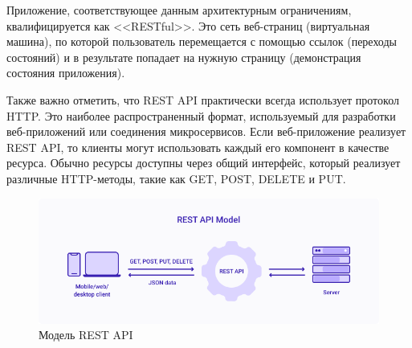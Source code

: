 


Приложение, соответствующее данным архитектурным ограничениям, квалифицируется как <<RESTful>>. Это сеть веб-страниц (виртуальная машина), по которой пользователь перемещается с помощью ссылок (переходы состояний) и в результате попадает на нужную страницу (демонстрация состояния приложения).

Также важно отметить, что REST API практически всегда использует протокол HTTP. Это наиболее распространенный формат, используемый для разработки веб-приложений или соединения микросервисов. Если веб-приложение реализует REST API, то клиенты могут использовать каждый его компонент в качестве ресурса. Обычно ресурсы доступны через общий интерфейс, который реализует различные HTTP-методы, такие как GET, POST, DELETE и PUT.


\begin{figure}[h]
	\centering
	\includegraphics[width=\textwidth ]{img/REST.png}
	\caption{Модель REST API}
	\label{fig:REST}
\end{figure} 

